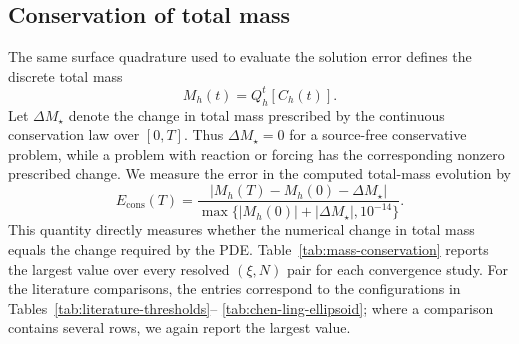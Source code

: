 \documentclass[a4paper,fleqn]{cas-sc}
\begin{document}
\subsection{Conservation of total mass}
\label{subsec:mass-conservation-results}

The same surface quadrature used to evaluate the solution error defines the
discrete total mass
\[
  M_h(t)=Q_h^t[C_h(t)].
\]
Let \(\Delta M_\star\) denote the change in total mass prescribed by the
continuous conservation law over \([0,T]\).  Thus \(\Delta M_\star=0\) for a
source-free conservative problem, while a problem with reaction or forcing
has the corresponding nonzero prescribed change.  We measure the error in
the computed total-mass evolution by
\begin{equation}
  E_{\mathrm{cons}}(T)
  =
  \frac{|M_h(T)-M_h(0)-\Delta M_\star|}
       {\max\{|M_h(0)|+|\Delta M_\star|,10^{-14}\}}.
  \label{eq:results-relative-conservation-error}
\end{equation}
This quantity directly measures whether the numerical change in total mass
equals the change required by the PDE.  Table~\ref{tab:mass-conservation}
reports the largest value over every resolved \((\xi,N)\) pair for each
convergence study.  For the literature comparisons, the entries correspond
to the configurations in Tables~\ref{tab:literature-thresholds}--
\ref{tab:chen-ling-ellipsoid}; where a comparison contains several rows, we
again report the largest value.
\end{document}
